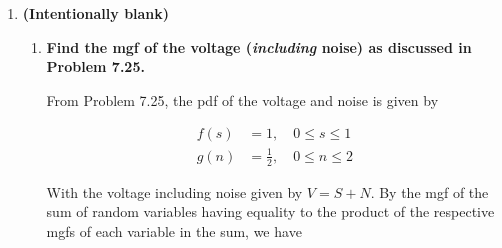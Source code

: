 \documentclass[10pt, oneside]{article}
\begin{document}
\begin{enumerate}[label=10.\arabic*]
\begin{enumerate}
	\[ E[X] = \lim_{t \rightarrow 0} M'_X(t) = \boxed{ \frac{2}{3} }\]
	
	To calculate $E[X^2]$, we must derive $M''(t)$:
	
	\[ M''_X(t) = \frac{12-12e^t}{t^4} + \frac{12e^t}{t^3} - \frac{6e^t}{t^2} + \frac{2e^t}{t} \]
	
	Now, a term-by-term application of l'H\^{o}pital will make the evaluation of the limit far less painful (in general this should be your strategy for these types of problems). This only works, however, because combining into one term reveals
	
	\[ \lim_{t \rightarrow 0} \frac{12 - 12e^t + 12te^t - 6t^2 e^t + 2t^3 e^t}{t^4} = \frac{0}{0} \]
	
	that the pre-requisite of the indeterminate form is satisfied. As long as this is satisfied, we can proceed with the far simpler term-by-term differentiation. Doing so yields
	
	\[ E[X^2] = \lim_{t \rightarrow 0} M''_X(t) = \frac{1}{2} \]
	
	Finally we can calculate
	
	\[ V[X] = E[X^2] - E[X]^2 = \frac{1}{2} - \bigg( \frac{2}{3} \bigg)^2 = \boxed{\frac{1}{18}} \]
	
	\end{enumerate}

\item  \begin{tcolorbox}[
  colback=Cerulean!5!white,
  colframe=Cerulean!75!black]
\textbf{(Intentionally blank)}
\end{tcolorbox}

	\begin{enumerate}
	\item  \begin{tcolorbox}[
	  colback=Cerulean!5!white,
	  colframe=Cerulean!75!black]
	\textbf{Find the mgf of the voltage (\textit{including} noise) as discussed in Problem 7.25.}
	\end{tcolorbox}
	
	From Problem 7.25, the pdf of the voltage and noise is given by
	
	\begin{align*}
	f(s) &= 1, \quad 0 \leq s \leq 1 \\
	g(n) &= \frac{1}{2}, \quad 0 \leq n \leq 2
	\end{align*}
	
	With the voltage including noise given by $V = S + N$. By the mgf of the sum of random variables having equality to the product of the respective mgfs of each variable in the sum, we have
	

\end{enumerate}
\end{enumerate}
\end{document}
